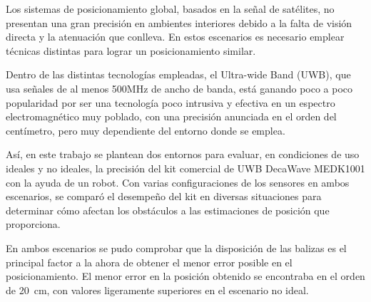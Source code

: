 Los sistemas de posicionamiento global, basados en la señal de satélites, no presentan una gran precisión en ambientes interiores debido a la falta de visión directa y la atenuación que conlleva. En estos escenarios es necesario emplear técnicas distintas para lograr un posicionamiento similar.

Dentro de las distintas tecnologías empleadas, el Ultra-wide Band (UWB), que usa señales de al menos 500MHz de ancho de banda, está ganando poco a poco popularidad por ser una tecnología poco intrusiva y efectiva en un espectro electromagnético muy poblado, con una precisión anunciada en el orden del centímetro, pero muy dependiente del entorno donde se emplea.

Así, en este trabajo se plantean dos entornos para evaluar, en condiciones de uso ideales y no ideales, la precisión del kit comercial de UWB DecaWave MEDK1001 con la ayuda de un robot.
Con varias configuraciones de los sensores en ambos escenarios, se comparó el desempeño del kit en diversas situaciones para determinar cómo afectan los obstáculos a las estimaciones de posición que proporciona.

En ambos escenarios se pudo comprobar que la disposición de las balizas es el principal factor a la ahora de obtener el menor error posible en el posicionamiento.
El menor error en la posición obtenido se encontraba en el orden de 20~cm, con valores ligeramente superiores en el escenario no ideal.